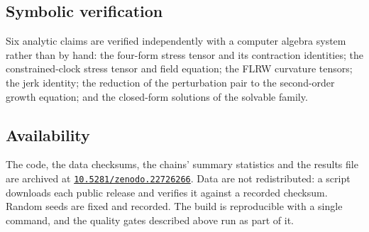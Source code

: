\subsection{Symbolic verification}\label{app:numerics-symbolic}

Six analytic claims are verified independently with a computer algebra system
rather than by hand: the four-form stress tensor and its contraction
identities; the constrained-clock stress tensor and field equation; the FLRW
curvature tensors; the jerk identity; the reduction of the perturbation pair to
the second-order growth equation; and the closed-form solutions of the solvable
family.

\subsection{Availability}\label{app:numerics-availability}

The code, the data checksums, the chains' summary statistics and the results
file are archived at \href{https://doi.org/10.5281/zenodo.22726266}{\texttt{10.5281/zenodo.22726266}}. Data are not redistributed: a script
downloads each public release and verifies it against a recorded checksum.
Random seeds are fixed and recorded. The build is reproducible with a single
command, and the quality gates described above run as part of it.
